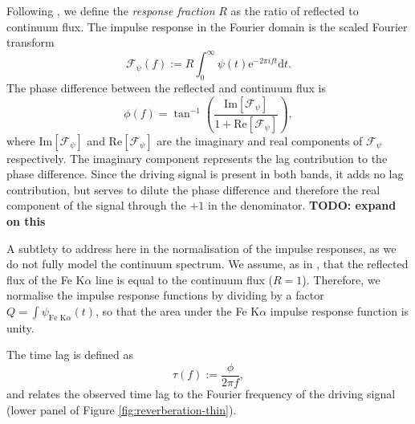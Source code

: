 \documentclass[fleqn,usenatbib]{mnras}
\newcommand{\todo}[1]{{\noindent \bf \color{red} TODO: #1}}
\newcommand{\FeKa}{Fe K$\alpha$ }
\newcommand{\e}{\text{e}}
\renewcommand{\d}{\text{d}}
\renewcommand{\Im}[1]{\text{Im}\left[#1\right]}
\renewcommand{\Re}[1]{\text{Re}\left[#1\right]}
\begin{document}
Following \cite{cackett_modelling_2014}, we define the \textit{response
fraction} $R$ as the ratio of reflected to continuum flux. The impulse response
in the Fourier domain is the scaled Fourier transform
\begin{equation}
	\mathscr{F}_\psi(f) := R \int_{0}^\infty \psi(t) \e^{-2\pi i f t} \d t.
\end{equation}
The phase difference between the reflected and continuum flux is
\begin{equation}
	\phi(f) = \tan^{-1} \left(
		\frac{\Im{\mathscr{F}_\psi}}{1 + \Re{\mathscr{F}_\psi}}
	\right),
\end{equation}
where $\Im{\mathscr{F}_\psi}$ and $\Re{\mathscr{F}_\psi}$ are the imaginary and
real components of $\mathscr{F}_\psi$ respectively. The imaginary component
represents the lag contribution to the phase difference. Since the driving
signal is present in both bands, it adds no lag contribution, but serves to
dilute the phase difference and therefore the real component of the signal
through the $+1$ in the denominator. \todo{expand on this}

A subtlety to address here in the normalisation of the impulse responses, as we
do not fully model the continuum spectrum. We assume, as in
\cite{cackett_modelling_2014}, that the reflected flux of the Fe
K$\alpha$ line is equal to the continuum flux ($R = 1$). Therefore, we normalise
the impulse response functions by dividing by a factor $Q = \int \psi_{\text{Fe
K}\alpha}(t)$, so that the area under the \FeKa impulse response function
is unity.


The time lag is defined as
\begin{equation}
	\tau(f) := \frac{\phi}{2 \pi f},
\end{equation}
and relates the observed time lag to the Fourier frequency of the driving signal (lower panel of Figure \ref{fig:reverberation-thin}).
\end{document}
